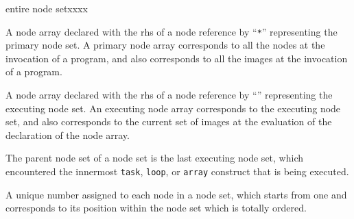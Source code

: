 \begin{namelist}{entire node setxxxx}

 A node array declared with the rhs of a node reference by ``{\tt **}''
 representing the primary node set.
 A primary node array corresponds to all the nodes at the invocation of
 a program, and also corresponds to all the images at the invocation of
 a program.


 A node array declared with the rhs of a node reference by ``{\tt *}''
 representing the executing node set.
 An executing node array corresponds to the executing node set, and also
 corresponds to the current set of images at the evaluation of the
 declaration of the node array.


 The parent node set of a node set is the last executing node set, which
 encountered the innermost {\tt task}, {\tt loop}, or {\tt array}
 construct that is being executed.


 A unique number assigned to each node in a node set, which starts from
 one and corresponds to its position within the node set which is
 totally ordered.

%


\end{namelist}
